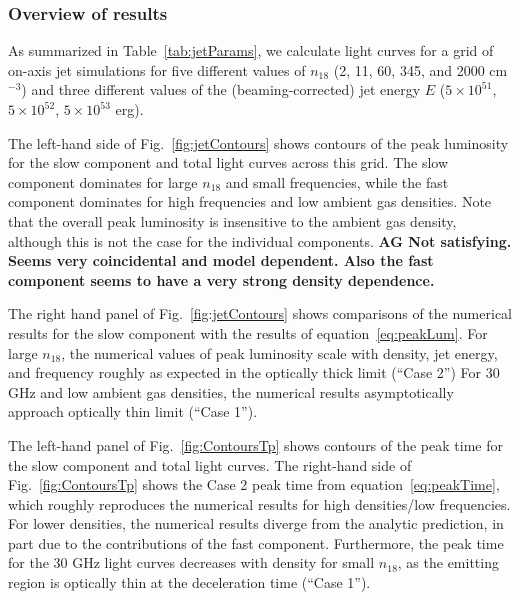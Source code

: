 \documentclass[usenatbib,fleqn]{mnras}
\begin{document}
\subsubsection{Overview of results}
As summarized in Table~\ref{tab:jetParams}, we calculate light curves
for a grid of on-axis jet simulations for five different values of
$n_{18}$ (2, 11, 60, 345, and 2000 cm$^{-3}$) and three different
values of the (beaming-corrected) jet energy $E$ ($5\times 10^{51}$,
$5\times 10^{52}$, $5\times 10^{53}$ erg). 

The left-hand side of Fig.~\ref{fig:jetContours} shows contours of the
peak luminosity for the slow component and total light curves across
this grid. The slow component dominates for large $n_{18}$ and small
frequencies, while the fast component dominates for high frequencies
and low ambient gas densities. Note that the overall peak luminosity
is insensitive to the ambient gas density, although this is not the
case for the individual components.  {\bf AG Not
  satisfying. Seems very coincidental and model dependent. Also the
  fast component seems to have a very strong density dependence.}

The right hand panel of Fig.~\ref{fig:jetContours} shows comparisons of
the numerical results for the slow component with the results of
equation~\eqref{eq:peakLum}. For large $n_{18}$, the numerical values
of peak luminosity scale with density, jet energy, and frequency
roughly as expected in the optically thick limit (``Case 2'') For 30
GHz and low ambient gas densities, the numerical results
asymptotically approach optically thin limit (``Case 1'').

The left-hand panel of Fig.~\ref{fig:ContoursTp} shows contours of the
peak time for the slow component and total light curves. The
right-hand side of Fig.~\ref{fig:ContoursTp} shows the Case 2 peak
time from equation~\eqref{eq:peakTime}, which roughly reproduces the
numerical results for high densities/low frequencies. For lower
densities, the numerical results diverge from the analytic prediction,
in part due to the contributions of the fast component.  Furthermore,
the peak time for the 30 GHz light curves decreases with density for
small $n_{18}$, as the emitting region is optically thin at the
deceleration time (``Case 1'').
\end{document}
